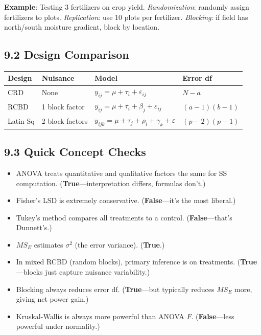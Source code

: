 \documentclass[9pt,letterpaper]{article}
\begin{document}
\textbf{Example}: Testing 3 fertilizers on crop yield. \emph{Randomization}: randomly assign fertilizers to plots. \emph{Replication}: use 10 plots per fertilizer. \emph{Blocking}: if field has north/south moisture gradient, block by location.

\subsection{9.2 Design Comparison}

\begin{center}\small
\begin{tabular}{@{}p{1.6cm}p{2.2cm}p{2.8cm}p{2.5cm}@{}}
\toprule
\textbf{Design} & \textbf{Nuisance} & \textbf{Model} & \textbf{Error df} \\
\midrule
CRD & None & $y_{ij}=\mu+\tau_i+\varepsilon_{ij}$ & $N-a$ \\
RCBD & 1 block factor & $y_{ij}=\mu+\tau_i+\beta_j+\varepsilon_{ij}$ & $(a-1)(b-1)$ \\
Latin Sq & 2 block factors & $y_{ijk}=\mu+\tau_j+\rho_i+\gamma_k+\varepsilon$ & $(p-2)(p-1)$ \\
\bottomrule
\end{tabular}
\end{center}

\subsection{9.3 Quick Concept Checks}

\begin{itemize}
    \item ANOVA treats quantitative and qualitative factors the same for SS computation. (\textbf{True}---interpretation differs, formulas don't.)
    \item Fisher's LSD is extremely conservative. (\textbf{False}---it's the most liberal.)
    \item Tukey's method compares all treatments to a control. (\textbf{False}---that's Dunnett's.)
    \item $MS_E$ estimates $\sigma^2$ (the error variance). (\textbf{True}.)
    \item In mixed RCBD (random blocks), primary inference is on treatments. (\textbf{True}---blocks just capture nuisance variability.)
    \item Blocking always reduces error df. (\textbf{True}---but typically reduces $MS_E$ more, giving net power gain.)
    \item Kruskal-Wallis is always more powerful than ANOVA $F$. (\textbf{False}---less powerful under normality.)
\end{itemize}
\end{document}
